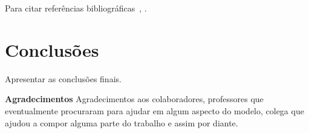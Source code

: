 \documentclass[12pt,fleqn]{article}
\begin{document}
Para citar referências bibliográficas~\cite{Adler89}, \cite{Carmo05}.



\section{Conclusões}
Apresentar as conclusões finais.

\vspace{5mm}
{\bf{Agradecimentos}} Agradecimentos aos colaboradores, professores que eventualmente procuraram para ajudar em
algum aspecto do modelo, colega que ajudou a compor alguma parte do trabalho e assim por diante.


\end{document}
